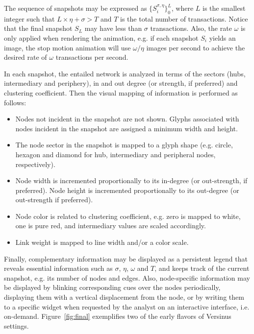 \documentclass[runningheads]{llncs}
\begin{document}
\noindent The sequence of snapshots may be expressed as $\{S_i^{\sigma, \eta}\}_0^{L}$, where $L$ is the smallest integer such that $L\times \eta + \sigma > T$ and $T$ is the total number of transactions. Notice that the final snapshot $S_L$ may have less than $\sigma$ transactions. Also, the rate $\omega$ is only applied when rendering the animation, e.g. if each snapshot $S_i$ yields an image, the stop motion animation will use $\omega/\eta$ images per second to achieve the desired rate of $\omega$ transactions per second.

In each snapshot, the entailed network is analyzed in terms of the sectors (hubs, intermediary and periphery), in and out degree (or strength, if preferred) and clustering coefficient. Then the visual mapping of information is performed as follows:
\begin{itemize}
  \item Nodes not incident in the snapshot are not shown. Glyphs associated with nodes incident in the snapshot are assigned a minimum width and height.
  \item The node sector in the snapshot is mapped to a glyph shape (e.g. circle, hexagon and diamond for hub, intermediary and peripheral nodes, respectively).
  \item Node width is incremented proportionally to its in-degree (or out-strength, if preferred). Node height is incremented proportionally to its out-degree (or out-strength if preferred).
  \item Node color is related to clustering coefficient, e.g. zero is mapped to white, one is pure red, and intermediary values are scaled accordingly.
  \item Link weight is mapped to line width and/or a color scale.
\end{itemize}

\noindent Finally, complementary information may be displayed as a persistent legend that reveals essential information such as $\sigma$, $\eta$, $\omega$ and $T$, and keeps track of the current snapshot, e.g. its number of nodes and edges.
Also, node-specific information may be displayed by blinking corresponding cues over the nodes periodically, displaying them with a vertical displacement from the node, or by writing them to a specific widget when requested by the analyst on an interactive interface, i.e. on-demand.
Figure~\ref{fig:final} exemplifies two of the early flavors of Versinus settings.
\end{document}
